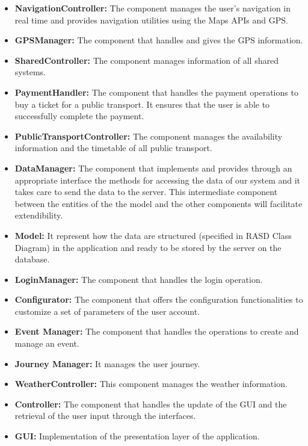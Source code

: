 \begin{itemize}
\item
\textbf{NavigationController:} The component manages the user's navigation in real time and provides navigation utilities using the Maps APIs and GPS. 
\item
\textbf{GPSManager:} The component that handles and gives the GPS information.
\item
\textbf{SharedController:} The component manages information of all shared systems.
\item
\textbf{PaymentHandler:} The component that handles the payment operations to buy a ticket for a public transport. It ensures that the user is able to successfully complete the payment.
\item
\textbf{PublicTransportController:} The component manages the availability information and the timetable of all public transport.
\item
\textbf{DataManager:} The component that implements and provides through an appropriate interface the methods for accessing the data of our system and it takes care to send the data to the server. This intermediate component between the entities of the the model and the other components will facilitate extendibility.
\item
\textbf{Model:} It represent how the data are structured (specified in RASD Class Diagram) in the application and ready to be stored by the server on the database.
\item
\textbf{LoginManager:} The component that handles the login operation.
\item
\textbf{Configurator:} The component that offers the configuration functionalities
to customize a set of parameters of the user account.
\item
\textbf{Event Manager:} The component that handles the operations to create and manage an event.
\item
\textbf{Journey Manager:} It manages the user journey.
\item
\textbf{WeatherController:} This component manages the weather information.
\item
\textbf{Controller:} The component that handles the update of the GUI and the retrieval of the user input through the interfaces.
\item
\textbf{GUI:} Implementation of the presentation layer of the application.
\end{itemize}

